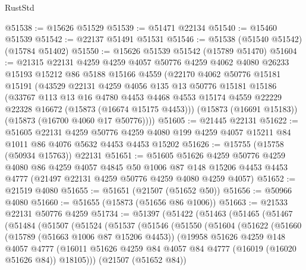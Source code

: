 \begin{lexlean}{RustStd}
\begin{coremodule}
@51538 := @15626 @51529
@51539 := @51471 @22134
@51540 := @15460 @51539
@51542 := @22137 @51491 @51531
@51546 := @51538 (@51540 @51542) (@15784 @51402)
@51550 := @15626 @51539 @51542 (@15789 @51470)
@51604 := @21315
    @22131
    @4259
    @4259
    @4057
    @50776
    @4259
    @4062
    @4080
    @26233
    @15193
    @15212
    @86
    @5188
    @15166
    @4559
    (@22170
      @4062
      @50776
      @15181
      @15191
      (@43529
        @22131
        @4259
        @4056
        @135
        @13
        @50776
        @15181
        @15186
        (@33767
          @113
          @13
          @16
          @4780
          @4453
          @4468
          @4553
          @15174
          @4559
          @22229
          @22328
          @16672
          (@15873 (@16674 @15175 @4453)))
        (@15873 (@16691 @15183))
        (@15873 (@16700 @4060 @17 @50776))))
@51605 := @21445 @22131
@51622 := @51605
    @22131
    @4259
    @50776
    @4259
    @4080
    @199
    @4259
    @4057
    @15211
    @84
    @1011
    @86
    @4076
    @5632
    @4453
    @4453
    @15202
@51626 := @15755 (@15758 (@50934 @15763)) @22131
@51651 := @51605
    @51626
    @4259
    @50776
    @4259
    @4080
    @86
    @4259
    @4057
    @4845
    @50
    @1006
    @87
    @148
    @15206
    @4453
    @4453
    @4777
    (@21497 @22131 @4259 @50776 @4259 @4080 @4259 @4057)
@51652 := @21519 @4080
@51655 := @51651 (@21507 (@51652 @50))
@51656 := @50966 @4080
@51660 := @51655 (@15873 (@51656 @86 @1006))
@51663 := @21533 @22131 @50776 @4259
@51734 := @51397
    (@51422
      (@51463
        (@51465
          (@51467
            (@51484
              (@51507
                (@51524
                  (@51537
                    (@51546
                      (@51550
                        (@51604
                          (@51622
                            (@51660
                              (@15789 (@51663 @1006 @87 @15206 @4453))
                              (@19958
                                @51626
                                @4259
                                @148
                                @4057
                                @4777
                                (@16011
                                  @51626
                                  @4259
                                  @84
                                  @4057
                                  @84
                                  @4777
                                  (@16019 (@16020 @51626 @84))
                                  @18105)))
                            (@21507 (@51652 @84))

\end{coremodule}
\end{lexlean}
